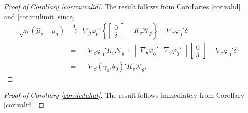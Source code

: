 \begin{proof}[Proof of Corollary \ref{cor:muvalid}]
The result follows from Corollaries \ref{cor:valid} and \ref{cor:mulimit} since,
	\begin{eqnarray*}
		\sqrt{n}\left( \widehat{\mu}_v - \mu_n\right) &\overset{d}{\rightarrow}&\nabla_\beta\varphi_0' \left\{ \left[\begin{array}{c} 0\\ \delta \end{array}\right] -K_v\mathscr{N}_g  \right\}-\nabla_\gamma \varphi_0' \delta\\ 
			&=& -\nabla_\beta\varphi_0' K_v\mathscr{N}_g + \left[\begin{array}{cc} \nabla_\theta\varphi_0'  & \nabla_\gamma\varphi_0' \end{array}\right]\left[\begin{array}{c} 0\\ \delta\end{array}\right]-\nabla_\gamma \varphi_0' \delta\\
			&=& -\nabla_\beta(\gamma_0,\theta_0)' K_v\mathscr{N}_g.
	\end{eqnarray*}
\end{proof}

\begin{proof}[Proof of Corollary \ref{cor:deltahat}]
  The result follows immediately from Corollary \ref{cor:valid}.
\end{proof}

